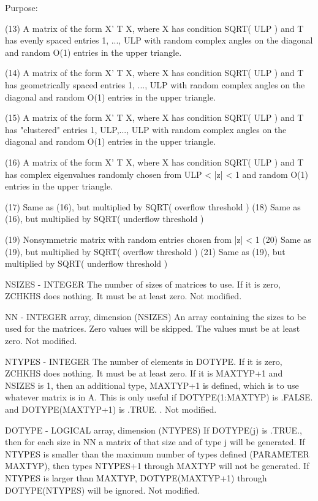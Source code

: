 \begin{DoxyParagraph}{Purpose\+: }
\begin{DoxyVerb}
    (13) A matrix of the form  X' T X, where X has condition
         SQRT( ULP ) and T has evenly spaced entries 1, ..., ULP
         with random complex angles on the diagonal and random O(1)
         entries in the upper triangle.

    (14) A matrix of the form  X' T X, where X has condition
         SQRT( ULP ) and T has geometrically spaced entries
         1, ..., ULP with random complex angles on the diagonal
         and random O(1) entries in the upper triangle.

    (15) A matrix of the form  X' T X, where X has condition
         SQRT( ULP ) and T has "clustered" entries 1, ULP,..., ULP
         with random complex angles on the diagonal and random O(1)
         entries in the upper triangle.

    (16) A matrix of the form  X' T X, where X has condition
         SQRT( ULP ) and T has complex eigenvalues randomly chosen
         from   ULP < |z| < 1   and random O(1) entries in the upper
         triangle.

    (17) Same as (16), but multiplied by SQRT( overflow threshold )
    (18) Same as (16), but multiplied by SQRT( underflow threshold )

    (19) Nonsymmetric matrix with random entries chosen from |z| < 1
    (20) Same as (19), but multiplied by SQRT( overflow threshold )
    (21) Same as (19), but multiplied by SQRT( underflow threshold )\end{DoxyVerb}
 \begin{DoxyVerb}  NSIZES - INTEGER
           The number of sizes of matrices to use.  If it is zero,
           ZCHKHS does nothing.  It must be at least zero.
           Not modified.

  NN     - INTEGER array, dimension (NSIZES)
           An array containing the sizes to be used for the matrices.
           Zero values will be skipped.  The values must be at least
           zero.
           Not modified.

  NTYPES - INTEGER
           The number of elements in DOTYPE.   If it is zero, ZCHKHS
           does nothing.  It must be at least zero.  If it is MAXTYP+1
           and NSIZES is 1, then an additional type, MAXTYP+1 is
           defined, which is to use whatever matrix is in A.  This
           is only useful if DOTYPE(1:MAXTYP) is .FALSE. and
           DOTYPE(MAXTYP+1) is .TRUE. .
           Not modified.

  DOTYPE - LOGICAL array, dimension (NTYPES)
           If DOTYPE(j) is .TRUE., then for each size in NN a
           matrix of that size and of type j will be generated.
           If NTYPES is smaller than the maximum number of types
           defined (PARAMETER MAXTYP), then types NTYPES+1 through
           MAXTYP will not be generated.  If NTYPES is larger
           than MAXTYP, DOTYPE(MAXTYP+1) through DOTYPE(NTYPES)
           will be ignored.
           Not modified.


\end{DoxyVerb}
\end{DoxyParagraph}
